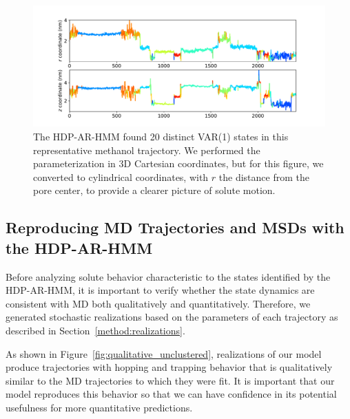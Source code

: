 \documentclass[journal=jpcbfk,manuscript=article]{achemso}
\begin{document}
  \begin{figure}
  \centering
  \includegraphics[width=\textwidth]{rz_unclustered_MET.pdf}
  \caption{The HDP-AR-HMM found 20 distinct VAR(1) states in this representative methanol trajectory.
  We performed the parameterization in 3D Cartesian coordinates, but for this figure, we 
  converted to cylindrical coordinates, with $r$ the distance from the pore center, to 
  provide a clearer picture of solute motion.}\label{fig:rz_unclustered}
  \end{figure}
  
  \subsection{Reproducing MD Trajectories and MSDs with the HDP-AR-HMM}\label{section:unclustered_MSD_prediction}

  Before analyzing solute behavior characteristic to the states identified by the
  HDP-AR-HMM, it is important to verify whether the state dynamics are consistent with MD
  both qualitatively and quantitatively. Therefore, we generated stochastic 
  realizations based on the parameters of each trajectory as described in 
  Section~\ref{method:realizations}.
  
  As shown in Figure~\ref{fig:qualitative_unclustered}, realizations of our model 
  produce trajectories with hopping and trapping behavior that is qualitatively 
  similar to the MD trajectories to which they were fit. It is important that our
  model reproduces this behavior so that we can have confidence in its potential
  usefulness for more quantitative predictions.
  
\end{document}
